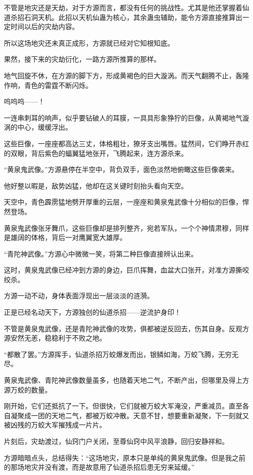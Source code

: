 \begin{this_body}
不管是地灾还是天劫，对于方源而言，都没有任何的挑战性。尤其是他还掌握着仙道杀招石洞天机。此招以天机仙蛊为核心，其余蛊虫辅助，能令方源直接推算出一定时间以后的灾劫内容。

所以这场地灾还未真正成形，方源就已经对它知根知底。

果然，接下来的灾劫衍化，一路方源所推算的那样。

地气回旋不休，在方源的脚下方，形成黄褐色的巨大漩涡。而天气翻腾不止，轰隆作响，青色的雷霆不断闪烁。

呜呜呜——！

一连串刺耳的响声，似乎要钻破人的耳膜，一具具形象狰狞的巨像，从黄褐地气漩涡的中心，缓缓浮出。

这些巨像，一座座都高达三丈，体格粗壮，獠牙支出嘴唇。猛然间，它们睁开赤红的双眼，背后紫色的蝠翼猛地张开，飞腾起来，连方源杀来。

“黄泉鬼武像。”方源悬停在半空中，背负双手，面色淡然地俯瞰这些巨像袭来。

他好整以暇是，敌势凶猛，他却在这关键时刻抬头看向天空。

天空中，青色霹雳猛地劈开厚重的云层，一座座和黄泉鬼武像十分相似的巨像，悍然登场。

黄泉鬼武像张牙舞爪，这些巨像却是排列整齐，宛若军队，一个个神情肃穆，同样是雄阔的体格，背后一对鹰翼宽大雄厚。

“青陀神武像。”方源心中微微一笑，将第二种巨像直接辨认出来。

这时，黄泉鬼武像已经冲到方源的身边，巨爪挥舞，血盆大口张开，对准方源撕咬绞杀。

方源一动不动，身体表面浮现出一层淡淡的涟漪。

正是已经名动天下，方源独创的仙道杀招——逆流护身印！

不管是黄泉鬼武像，还是青陀神武像的攻势，俱都被逆反回去，伤其自身。反观方源安然无恙，稳稳利于不败之地。

“都散了罢。”方源挥手，仙道杀招万蛟爆发而出，银鳞如海，万蛟飞腾，无穷无尽。

黄泉鬼武像、青陀神武像数量虽多，也随着天地二气，不断产出，但哪里及得上方源万蛟的数量。

刚开始，它们还抵抗了一下。但很快，它们就被万蛟大军淹没，严重减员。直至各自凝聚成一团的天地二气，都被万蛟冲散。天意不甘，想要重新凝聚，下一刻就又被凶残的万蛟大军摧残成一片片。

片刻后，灾劫渡过，仙窍门户关闭，至尊仙窍中风平浪静，回归安静祥和。

方源暗暗点头，总结得失：“这场地灾，原本只是单纯的黄泉鬼武像。但是我之前的那场地灾并没有渡，而是故意用了仙道杀招后患无穷来延缓。”


\end{this_body}
